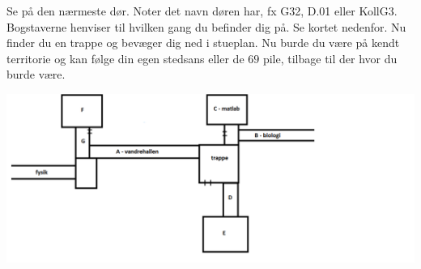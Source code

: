 \begin{minipage}[t]{170mm}
Se på den nærmeste dør. Noter det navn døren har, fx G32, D.01 eller KollG3. Bogstaverne henviser til hvilken gang du befinder dig på. Se kortet nedenfor. Nu finder du en trappe og bevæger dig ned i stueplan. Nu burde du være på kendt territorie og kan følge din egen stedsans eller de $69$ pile, tilbage til der hvor du burde være.
\begin{center}
\includegraphics[width=1.3\linewidth]{bogstav-kort.png}
\end{center}


\end{minipage}
